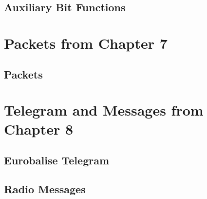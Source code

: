 \documentclass[paper=a4,12pt,DIV16,BCOR8mm,twoside]{scrreprt}
\begin{document}
\chapter{Auxiliary Bit Functions}

\part{Packets from Chapter 7}

\chapter{Packets}

\part{Telegram and Messages from Chapter 8}
\chapter{Eurobalise Telegram}
\chapter{Radio Messages}

\cleardoublepage

%
 

%
%
\end{document}
